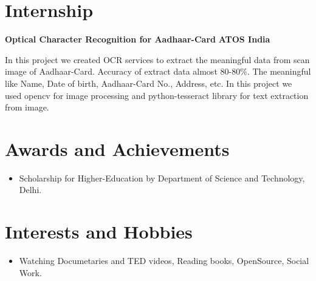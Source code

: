 \documentclass{article}
\begin{document}
\vspace*{.5cm}
\section{Internship}
\textbf{\large{Optical Character Recognition for Aadhaar-Card}} \hspace*{6cm} \textbf{ATOS India}

\vspace*{.051mm}
\hspace*{2.6mm} In this project we created OCR services to extract the meaningful data from scan image of Aadhaar-Card. Accuracy of extract data almost 80-80$\%.$ The meaningful like Name, Date of birth, Aadhaar-Card No., Address, etc. In this project we used opencv for image processing and python-tesseract library for text extraction from image.\\

\vspace*{.4cm}
\section{Awards and Achievements}
\begin{itemize}
\item Scholarship for Higher-Education by Department of Science and Technology, Delhi.
\end{itemize}

\vspace*{.1cm}
\section{Interests and Hobbies}
\begin{itemize}
\item Watching Documetaries and TED videos, Reading books, OpenSource, Social Work.
\end{itemize}
%
\end{document}
